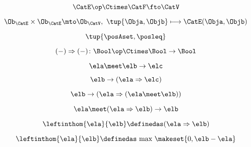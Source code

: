 {\begin{forslides}
    \begin{equation}
        \label{eq:slides_enrichment_55}
        \CatE\op \Ctimes \CatF \fto \CatV
    \end{equation}

    \begin{equation}
        \label{eq:slides_enrichment_56}
        \Ob_\CatE \times \Ob_\CatE \mto \Ob_\CatV, \ \tup{\Obja, \Objb} \longmapsto \CatE(\Obja, \Objb)
    \end{equation}

    \begin{equation}
        \label{eq:slides_enrichment_57}
        \tup{\posAset, \posleq}
    \end{equation}

    \begin{equation}
        \label{eq:slides_enrichment_58}
        ( - ) \Rightarrow ( - ) \colon \Bool\op \Ctimes \Bool \to \Bool
    \end{equation}

    \begin{equation}
        \label{eq:slides_enrichment_59}
        \ela \meet \elb \rightarrow \elc
    \end{equation}

    \begin{equation}
        \label{eq:slides_enrichment_60}
        \elb \rightarrow (\ela \Rightarrow \elc)
    \end{equation}

    \begin{equation}
        \label{eq:slides_enrichment_61}
        \elb \rightarrow (\ela \Rightarrow (\ela \meet \elb))
    \end{equation}

    \begin{equation}
        \label{eq:slides_enrichment_62}
        \ela \meet (\ela \Rightarrow \elb) \rightarrow \elb
    \end{equation}

    \begin{equation}
        \label{eq:slides_enrichment_63}
        \leftinthom{\ela}{\elb} \definedas (\ela \Rightarrow \elb)
    \end{equation}

    \begin{equation}
        \label{eq:slides_enrichment_64}
        \leftinthom{\ela}{\elb} \definedas \text{ max } \makeset{0, \elb - \ela}
    \end{equation}


\end{forslides}}
